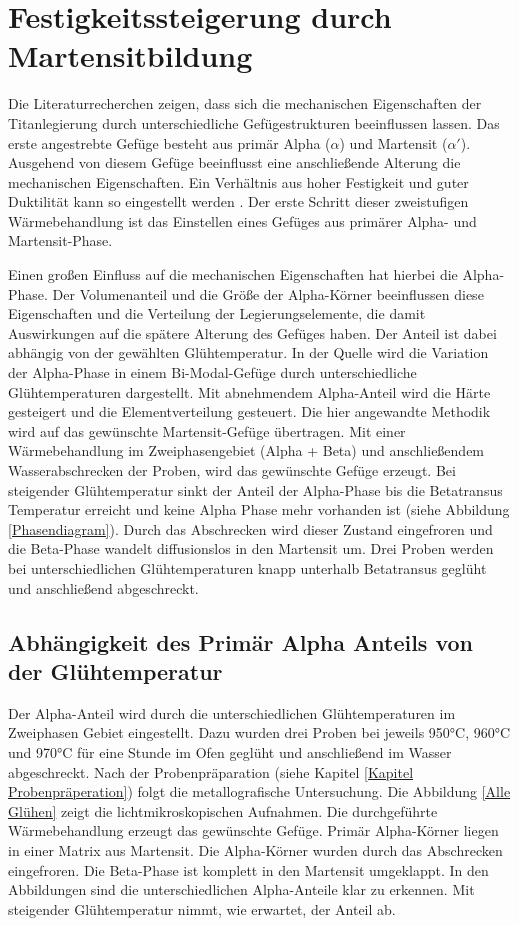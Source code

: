 \documentclass[a4paper, 11pt]{tubsreprt}
\begin{document}
\section{Festigkeitssteigerung durch Martensitbildung}\label{Festigkeitssteigerung durch Martensitbildung}
Die Literaturrecherchen zeigen, dass sich die mechanischen Eigenschaften der Titanlegierung durch unterschiedliche Gefügestrukturen beeinflussen lassen. Das erste angestrebte Gefüge besteht aus primär Alpha ($\alpha$) und Martensit ($\alpha'$). Ausgehend von diesem Gefüge beeinflusst eine anschließende Alterung die mechanischen Eigenschaften. Ein  Verhältnis aus hoher Festigkeit und guter Duktilität kann so eingestellt werden \cite{Gilbert1990}. Der erste Schritt dieser zweistufigen Wärmebehandlung ist das Einstellen eines Gefüges aus primärer Alpha- und Martensit-Phase.
 
Einen großen Einfluss auf die mechanischen Eigenschaften hat hierbei die Alpha-Phase. Der Volumenanteil und die Größe der Alpha-Körner beeinflussen diese Eigenschaften und die Verteilung der Legierungselemente, die damit Auswirkungen auf die spätere Alterung des Gefüges haben. Der Anteil ist dabei abhängig von der gewählten Glühtemperatur. In der Quelle \cite{Sahoo2015} wird die Variation der Alpha-Phase in einem Bi-Modal-Gefüge durch unterschiedliche Glühtemperaturen dargestellt. Mit abnehmendem Alpha-Anteil wird die Härte gesteigert und die Elementverteilung gesteuert. Die hier angewandte Methodik wird auf das gewünschte Martensit-Gefüge übertragen.
Mit einer Wärmebehandlung im Zweiphasengebiet (Alpha + Beta) und anschließendem Wasserabschrecken der Proben, wird das gewünschte Gefüge erzeugt. Bei steigender Glühtemperatur sinkt der Anteil der Alpha-Phase bis die Betatransus Temperatur erreicht und keine Alpha Phase mehr vorhanden ist (siehe Abbildung \ref{Phasendiagram}).  Durch das Abschrecken wird dieser Zustand eingefroren und die Beta-Phase wandelt diffusionslos in den Martensit um. Drei Proben werden bei unterschiedlichen Glühtemperaturen knapp unterhalb Betatransus geglüht und anschließend abgeschreckt.


\subsection{Abhängigkeit des Primär Alpha Anteils von der Glühtemperatur}
Der Alpha-Anteil wird durch die unterschiedlichen Glühtemperaturen im Zweiphasen Gebiet eingestellt. Dazu wurden drei Proben bei jeweils 950°C, 960°C und 970°C für eine Stunde im Ofen geglüht und anschließend im Wasser abgeschreckt. Nach der Probenpräparation (siehe Kapitel \ref{Kapitel Probenpräperation}) folgt die metallografische Untersuchung. Die Abbildung \ref{Alle Glühen} zeigt die lichtmikroskopischen Aufnahmen. Die durchgeführte Wärmebehandlung erzeugt das gewünschte Gefüge. Primär Alpha-Körner liegen in einer Matrix aus Martensit. Die Alpha-Körner wurden durch das Abschrecken eingefroren. Die Beta-Phase ist komplett in den Martensit umgeklappt. In den Abbildungen sind die unterschiedlichen Alpha-Anteile klar zu erkennen. Mit steigender Glühtemperatur nimmt, wie erwartet, der Anteil ab. 
\end{document}

